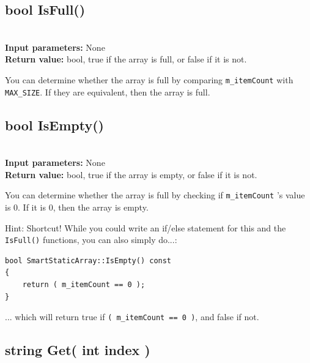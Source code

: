 \documentclass[a4paper,12pt]{book}
\begin{document}
    \subsection*{bool IsFull()}

    \begin{framed} ~\\
        \textbf{Input parameters:} None \\
        \textbf{Return value:} bool, true if the array is full, or false if it is not.
    \end{framed}

    You can determine whether the array is full by comparing \texttt{m\_itemCount}
    with \texttt{MAX\_SIZE}. If they are equivalent, then the array is full.
    
    \hrulefill
    \subsection*{bool IsEmpty()}

    \begin{framed} ~\\
        \textbf{Input parameters:} None \\
        \textbf{Return value:} bool, true if the array is empty, or false if it is not.
    \end{framed}

    You can determine whether the array is full by checking if \texttt{m\_itemCount}
    's value is 0. If it is 0, then the array is empty.

    \begin{hint}{Hint: Shortcut!}
        While you could write an if/else statement for this and the \texttt{IsFull()}
        functions, you can also simply do...:

\begin{verbatim}
bool SmartStaticArray::IsEmpty() const
{
    return ( m_itemCount == 0 );
}
\end{verbatim}

        ... which will return true if \texttt{( m\_itemCount == 0 )},
        and false if not.
    \end{hint}
    
    \hrulefill
    \subsection*{string Get( int index )}
\end{document}

